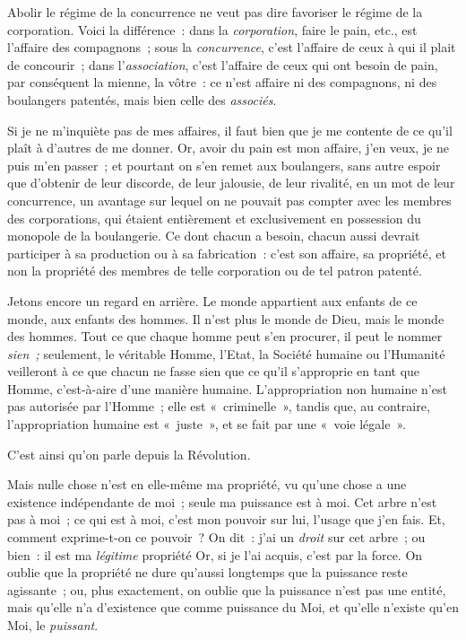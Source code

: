 \documentclass[french,twoside]{book} %
\begin{document}
Abolir le régime de la concurrence ne veut pas dire favoriser le régime de la corporation. Voici la différence : dans la \emph{corporation}, faire le pain, etc., est l’affaire des compagnons ; sous la \emph{concurrence}, c’est l’affaire de ceux à qui il plait de concourir ; dans l’\emph{association}, c’est l’affaire de ceux qui ont besoin de pain, par conséquent la mienne, la vôtre : ce n’est affaire ni des compagnons, ni des boulangers patentés, mais bien celle des \emph{associés}.\par
Si je ne m’inquiète pas de mes affaires, il faut bien que je me contente de ce qu’il plaît à d’autres de me donner. Or, avoir du pain est mon affaire, j’en veux, je ne puis m’en passer ; et pourtant on s’en remet aux boulangers, sans autre espoir que d’obtenir de leur discorde, de leur jalousie, de leur rivalité, en un mot de leur concurrence, un avantage sur lequel on ne pouvait pas compter avec les membres des corporations, qui étaient entièrement et exclusivement en possession du monopole de la boulangerie. Ce dont chacun a besoin, chacun aussi devrait participer à sa production ou à sa fabrication : c’est son affaire, sa propriété, et non la propriété des membres de telle corporation ou de tel patron patenté.\par
Jetons encore un regard en arrière. Le monde appartient aux enfants de ce monde, aux enfants des  hommes. Il n’est plus le monde de Dieu, mais le monde des hommes. Tout ce que chaque homme peut s’en procurer, il peut le nommer \emph{sien ;} seulement, le véritable Homme, l’Etat, la Société humaine ou l’Humanité veilleront à ce que chacun ne fasse sien que ce qu’il s’approprie en tant que Homme, c’est-à-aire d’une manière humaine. L’appropriation non humaine n’est pas autorisée par l’Homme ; elle est « criminelle », tandis que, au contraire, l’appropriation humaine est « juste », et se fait par une « voie légale ».\par
C’est ainsi qu’on parle depuis la Révolution.\par
Mais nulle chose n’est en elle-même ma propriété, vu qu’une chose a une existence indépendante de moi ; seule ma puissance est à moi. Cet arbre n’est pas à moi ; ce qui est à moi, c’est mon pouvoir sur lui, l’usage que j’en fais. Et, comment exprime-t-on ce pouvoir ? On dit : j’ai un \emph{droit} sur cet arbre ; ou bien : il est ma \emph{légitime} propriété Or, si je l’ai acquis, c’est par la force. On oublie que la propriété ne dure qu’aussi longtemps que la puissance reste agissante ; ou, plus exactement, on oublie que la puissance n’est pas une entité, mais qu’elle n’a d’existence que comme puissance du Moi, et qu’elle n’existe qu’en Moi, le \emph{puissant}.\par
\end{document}
